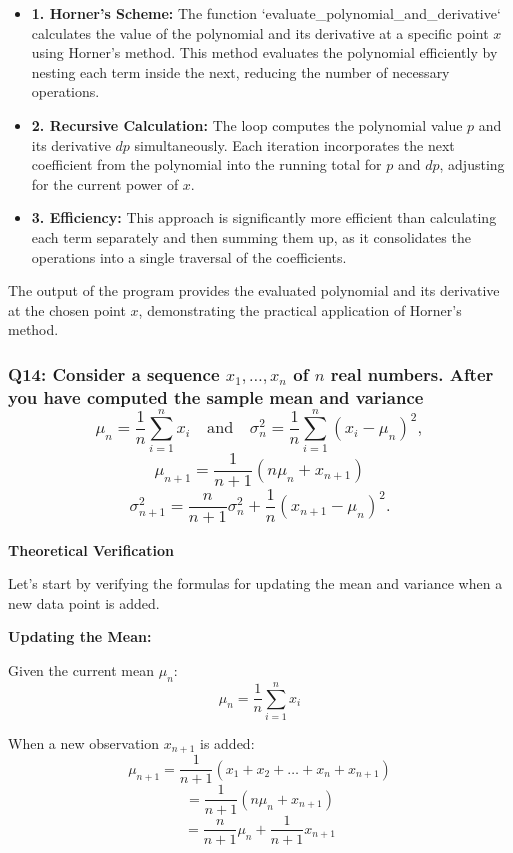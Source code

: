 \documentclass[8pt]{article}
\begin{document}
\begin{itemize}
    \item \textbf{1. Horner's Scheme:} The function `evaluate\_polynomial\_and\_derivative` calculates the value of the polynomial and its derivative at a specific point \(x\) using Horner's method. This method evaluates the polynomial efficiently by nesting each term inside the next, reducing the number of necessary operations.
    \item \textbf{2. Recursive Calculation:} The loop computes the polynomial value \(p\) and its derivative \(dp\) simultaneously. Each iteration incorporates the next coefficient from the polynomial into the running total for \(p\) and \(dp\), adjusting for the current power of \(x\).
    \item \textbf{3. Efficiency:} This approach is significantly more efficient than calculating each term separately and then summing them up, as it consolidates the operations into a single traversal of the coefficients.
\end{itemize}

The output of the program provides the evaluated polynomial and its derivative at the chosen point \(x\), demonstrating the practical application of Horner's method.

\subsubsection*{Q14: Consider a sequence \(x_1, \ldots, x_n\) of \(n\) real numbers. After you have computed the sample mean and variance
\[ \mu_n = \frac{1}{n} \sum_{i=1}^n x_i \quad \text{and} \quad \sigma_n^2 = \frac{1}{n} \sum_{i=1}^n (x_i - \mu_n)^2, \]
\[ \mu_{n+1} = \frac{1}{n+1} (n\mu_n + x_{n+1}) \]
\[ \sigma_{n+1}^2 = \frac{n}{n+1} \sigma_n^2 + \frac{1}{n} (x_{n+1} - \mu_n)^2. \]}

\textbf{Theoretical Verification}

Let's start by verifying the formulas for updating the mean and variance when a new data point is added.

\textbf{Updating the Mean:}

Given the current mean \(\mu_n\):
\[ \mu_n = \frac{1}{n} \sum_{i=1}^n x_i \]

When a new observation \(x_{n+1}\) is added:
\[ \mu_{n+1} = \frac{1}{n+1} (x_1 + x_2 + \ldots + x_n + x_{n+1}) \]
\[ = \frac{1}{n+1} \left( n\mu_n + x_{n+1} \right) \]
\[ = \frac{n}{n+1} \mu_n + \frac{1}{n+1} x_{n+1} \]
\end{document}
